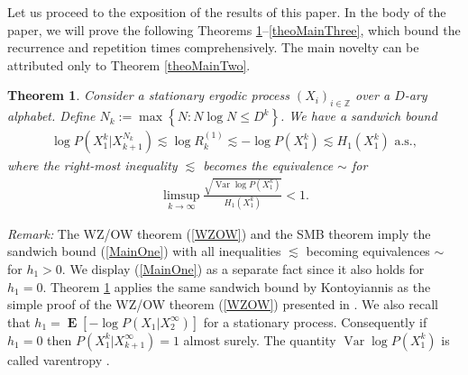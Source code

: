 \documentclass[a4paper,12pt]{article}
\newcommand{\kwad}[1]{\left[ #1 \right]}
\newcommand{\klam}[1]{\left\{ #1 \right\}}
\DeclareMathOperator{\var}{Var}
\DeclareMathOperator{\mean}{\mathbf{E}}
\newtheorem{theorem}{Theorem}
\begin{document}
Let us proceed to the exposition of the results of this paper.  In the
body of the paper, we will prove the following Theorems
\ref{theoMainOne}--\ref{theoMainThree}, which bound the recurrence and
repetition times comprehensively. The main novelty can be attributed
only to Theorem \ref{theoMainTwo}.
\begin{theorem}
  \label{theoMainOne}
  Consider a stationary ergodic process $(X_i)_{i\in\mathbb{Z}}$ over
  a $D$-ary alphabet. Define $N_k:=\max\klam{N: N\log N\le
    D^k}$. We have a sandwich bound
  \begin{align}
    \label{MainOne}
    \log P(X_1^k|X_{k+1}^{N_k})\lesssim
    \log R^{(1)}_k\lesssim
    -\log P(X_1^k)\lesssim
    H_1(X_1^k)
    \text{ a.s.},
  \end{align}
  where the right-most inequality $\lesssim$ becomes the equivalence
  $\sim$ for
  \begin{align}
    \limsup_{k\to\infty} \frac{\sqrt{\var\log P(X_1^k)}}{H_1(X_1^k)}<1.
  \end{align}
\end{theorem}
\noindent
\emph{Remark:} The WZ/OW theorem (\ref{WZOW}) and the SMB theorem
\cite{Shannon48, Breiman57} imply the sandwich bound (\ref{MainOne})
with all inequalities $\lesssim$ becoming equivalences $\sim$ for
$h_1>0$. We display (\ref{MainOne}) as a separate fact since it also
holds for $h_1=0$. Theorem \ref{theoMainOne} applies the same sandwich
bound by Kontoyiannis \cite{Kontoyiannis98} as the simple proof of the
WZ/OW theorem (\ref{WZOW}) presented in \cite[Theorem
9.12]{Debowski21}.  We also recall that
$h_1=\mean\kwad{-\log P(X_1|X_2^\infty)}$ for a stationary
process. Consequently if $h_1=0$ then $P(X_1^k|X_{k+1}^\infty)=1$
almost surely. The quantity $\var\log P(X_1^k)$ is called varentropy
\cite{KontoyiannisVerdu13}.
\end{document}
